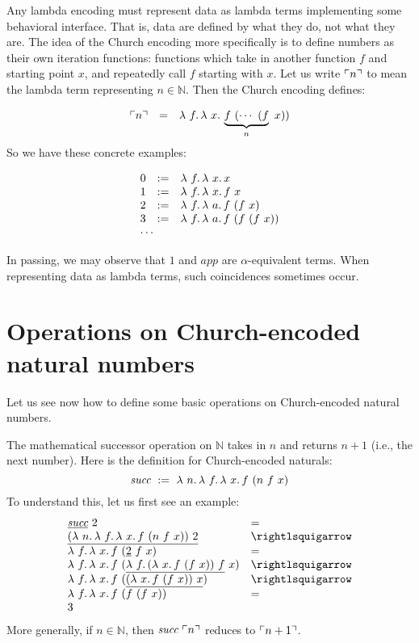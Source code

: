 Any lambda encoding must represent data as lambda terms implementing
some behavioral interface.  That is, data are defined by what they do,
not what they are.  The idea of the Church encoding more specifically
is to define numbers as their own iteration functions: functions which
take in another function $f$ and starting point $x$, and repeatedly
call $f$ starting with $x$.  Let us write $\ulcorner n \urcorner$ to mean the lambda
term representing $n\in\mathbb{N}$.  Then the Church encoding defines:

\[
\begin{array}{lll}
  \rep{n} & = & \lam{f}{\lam{x}{\underbrace{f \ (\cdots\  (f}_{n}\ x))}}
\end{array}
\]
\noindent So we have these concrete examples:

\[
\begin{array}{lll}
  0 & := & \lam{f}{\lam{x}{x}} \\
  1 & := & \lam{f}{\lam{x}{f\ x}} \\
  2 & := & \lam{f}{\lam{a}{f\ (f\ x)}} \\
  3 & := & \lam{f}{\lam{a}{f\ (f\ (f\ x))}} \\  
  \multicolumn{3}{l}{\cdots}
\end{array}
\]

\noindent In passing, we may observe that $1$ and $\textit{app}$ are $\alpha$-equivalent
terms.  When representing data as lambda terms, such coincidences
sometimes occur.

\section{Operations on Church-encoded natural numbers}

Let us see now how to define some basic operations on Church-encoded
natural numbers.

 The mathematical successor
operation on $\mathbb{N}$ takes in $n$
and returns $n+1$ (i.e., the next number).  Here is the definition for
Church-encoded naturals:
\[
\textit{succ}\ :=\ \lam{n}{\lam{f}{\lam{x}{f\ (n\ f\ x)}}}
\]
\noindent To understand this, let us first see an example:
\[
\begin{array}{ll}
  \underline{\textit{succ}}\ 2 & = \\
  \underline{(\lam{n}{\lam{f}{\lam{x}{f\ (n\ f\ x)}}})\ 2} & \betaa \\
  \lam{f}{\lam{x}{f\ (\underline{2}\ f\ x)}} & = \\
  \lam{f}{\lam{x}{f\ (\underline{\lam{f}{(\lam{x}{f\ (f\ x)})}\ f}\ x)}} & \betaa \\
  \lam{f}{\lam{x}{f\ (\underline{(\lam{x}{f\ (f\ x)})\ x})}} & \betaa \\
  \lam{f}{\lam{x}{f\ (f\ (f\ x))}} & = \\
  3
\end{array}
\]
More generally, if $n\in\mathbb{N}$, then $\textit{succ}\ \ulcorner n \urcorner$ reduces to $\ulcorner n+1 \urcorner$.

